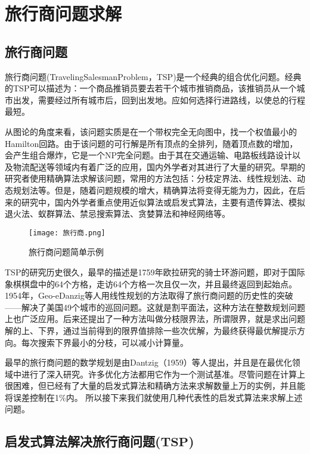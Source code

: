 \chapter{旅行商问题求解}
\section{旅行商问题}
旅行商问题(TravelingSalesmanProblem，TSP)是一个经典的组合优化问题。经典的TSP可以描述为：一个商品推销员要去若干个城市推销商品，该推销员从一个城市出发，需要经过所有城市后，回到出发地。应如何选择行进路线，以使总的行程最短。

从图论的角度来看，该问题实质是在一个带权完全无向图中，找一个权值最小的Hamilton回路。由于该问题的可行解是所有顶点的全排列，随着顶点数的增加，会产生组合爆炸，它是一个NP完全问题。由于其在交通运输、电路板线路设计以及物流配送等领域内有着广泛的应用，国内外学者对其进行了大量的研究。早期的研究者使用精确算法求解该问题，常用的方法包括：分枝定界法、线性规划法、动态规划法等。但是，随着问题规模的增大，精确算法将变得无能为力，因此，在后来的研究中，国内外学者重点使用近似算法或启发式算法，主要有遗传算法、模拟退火法、蚁群算法、禁忌搜索算法、贪婪算法和神经网络等。\cite{陈文兰2006旅行商问题算法研究综述}
\begin{figure}[hbt]
    \centering
    \texttt{[image: 旅行商.png]}
	\vspace{-0.5cm}
    \caption{旅行商问题简单示例}
    \label{旅行商}
\end{figure}

TSP的研究历史很久，最早的描述是1759年欧拉研究的骑士环游问题，即对于国际象棋棋盘中的64个方格，走访64个方格一次且仅一次，并且最终返回到起始点。1954年，Geo-eDanzig等人用线性规划的方法取得了旅行商问题的历史性的突破——解决了美国49个城市的巡回问题。这就是割平面法，这种方法在整数规划问题上也广泛应用。后来还提出了一种方法叫做分枝限界法，所谓限界，就是求出问题解的上、下界，通过当前得到的限界值排除一些次优解，为最终获得最优解提示方向。每次搜索下界最小的分枝，可以减小计算量。\cite{马少平朱小燕人工智能}

最早的旅行商问题的数学规划是由Dantzig（1959）等人提出，并且是在最优化领域中进行了深入研究。许多优化方法都用它作为一个测试基准。尽管问题在计算上很困难，但已经有了大量的启发式算法和精确方法来求解数量上万的实例，并且能将误差控制在1\%内。\cite{flood1956traveling} 所以接下来我们就使用几种代表性的启发式算法来求解上述问题。

\section{启发式算法解决旅行商问题($\textbf{TSP}$)}
